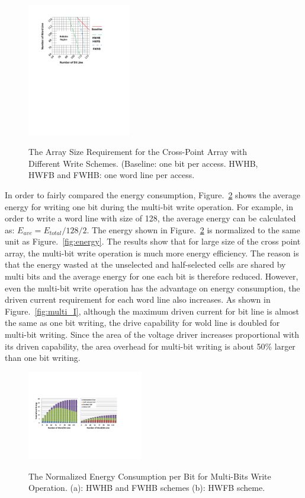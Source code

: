 \begin{figure}%
\centering
  \includegraphics[width=0.4\textwidth]{./figures/multiwrite.pdf}\\
  \caption{The Array Size Requirement for the Cross-Point Array with Different Write Schemes. (Baseline: one bit per access. HWHB, HWFB and FWHB: one word line per access. }\label{fig:reliable_region}
\end{figure}

In order to fairly compared the energy consumption, Figure.~\ref{fig:multi_energy} shows the average energy for writing one bit during the multi-bit write operation. For example, in order to write a word line with size of 128, the average energy can be calculated as:
$E_{ave}=E_{total}/128/2$. The energy shown in Figure.~\ref{fig:multi_energy} is normalized to the same unit as Figure.~\ref{fig:energy}. The results show that for large size of the cross point array, the multi-bit write operation is much more energy efficiency. The reason is that the energy wasted at the unselected and half-selected cells are shared by multi bits and the average energy for one each bit is therefore reduced. However, even the multi-bit write operation has the advantage on energy consumption, the driven current requirement for each word line also increases. As shown in Figure.~\ref{fig:multi_I}, although the maximum driven current for bit line is almost the same as one bit writing, the drive capability for wold line is doubled for multi-bit writing. Since the area of the voltage driver increases proportional with its driven capability, the area overhead for multi-bit writing is about 50\% larger than one bit writing.


\begin{figure}%
\centering
  \includegraphics[width=0.45\textwidth]{./figures/multi_energy2.pdf}\\
  \caption{The Normalized Energy Consumption per Bit for Multi-Bits Write Operation. (a): HWHB and  FWHB schemes (b): HWFB scheme. }\label{fig:multi_energy}
\end{figure}


